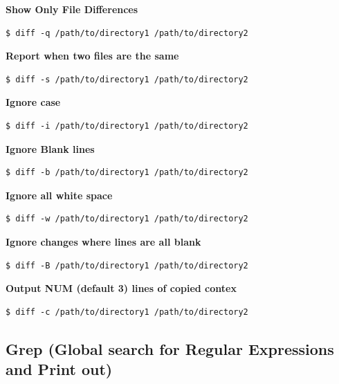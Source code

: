 \documentclass{article}
\newenvironment{codetemplate}[1][]{%
  \mybasecolorbox[#1]
  \itshape
}{%
  \endmybasecolorbox
}
\begin{document}
\textbf{Show Only File Differences}
\begin{codetemplate}{}
\begin{verbatim}
$ diff -q /path/to/directory1 /path/to/directory2
\end{verbatim}
\end{codetemplate}

\textbf{Report when two files are the same}
\begin{codetemplate}{}
\begin{verbatim}
$ diff -s /path/to/directory1 /path/to/directory2
\end{verbatim}
\end{codetemplate}

\textbf{Ignore case}
\begin{codetemplate}{}
\begin{verbatim}
$ diff -i /path/to/directory1 /path/to/directory2
\end{verbatim}
\end{codetemplate}

\textbf{Ignore Blank lines}
\begin{codetemplate}{}
\begin{verbatim}
$ diff -b /path/to/directory1 /path/to/directory2
\end{verbatim}
\end{codetemplate}

\textbf{Ignore all white space}
\begin{codetemplate}{}
\begin{verbatim}
$ diff -w /path/to/directory1 /path/to/directory2
\end{verbatim}
\end{codetemplate}

\textbf{Ignore changes where lines are all blank}
\begin{codetemplate}{}
\begin{verbatim}
$ diff -B /path/to/directory1 /path/to/directory2
\end{verbatim}
\end{codetemplate}

\textbf{Output NUM (default 3) lines of copied contex}
\begin{codetemplate}{}
\begin{verbatim}
$ diff -c /path/to/directory1 /path/to/directory2
\end{verbatim}
\end{codetemplate}

\subsection{Grep (Global search for Regular Expressions and Print out)}
\end{document}
